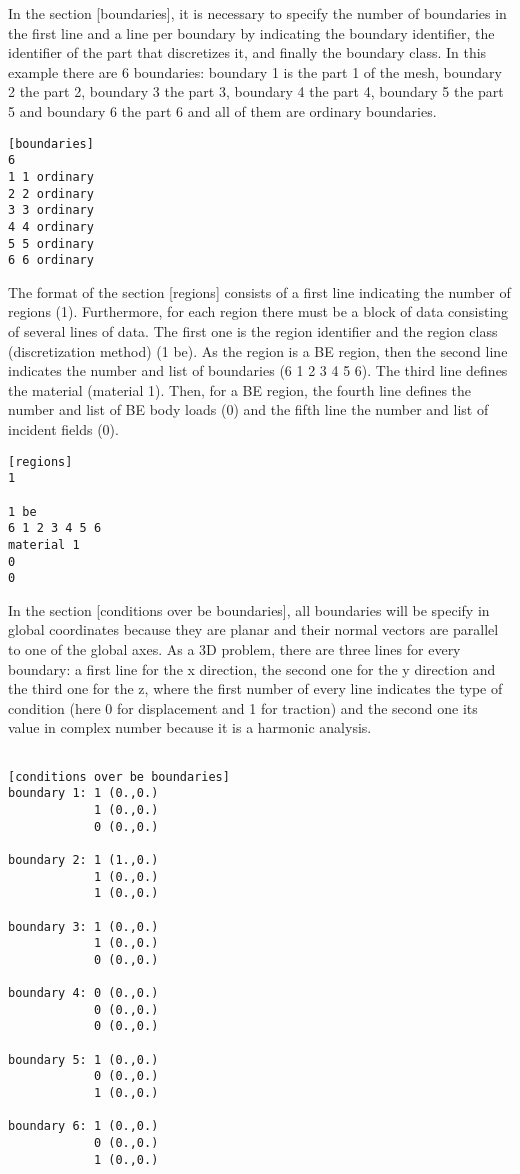 \documentclass[a4]{article}
\begin{document}
In the section [boundaries], it is necessary to specify the number of boundaries in the first line and a line per boundary by indicating the boundary identifier, the identifier of the part that discretizes it, and finally the boundary class. In this example there are 6 boundaries: boundary 1 is the part 1 of the mesh, boundary 2 the part 2, boundary 3 the part 3, boundary 4 the part 4, boundary 5 the part 5 and boundary 6 the part 6 and all of them are ordinary boundaries.

\begin{Verbatim}	
[boundaries]
6
1 1 ordinary
2 2 ordinary
3 3 ordinary
4 4 ordinary
5 5 ordinary
6 6 ordinary
\end{Verbatim}

The format of the section [regions] consists of a first line indicating the number of regions (1). Furthermore, for each region there must be a block of data consisting of several lines of data. The first one is the region identifier and the region class (discretization method) (1 be). As the region is a BE region, then the second line indicates the number and list of boundaries (6 1 2 3 4 5 6). The third line defines the material (material 1). Then, for a BE region, the fourth line defines the number and list of BE body loads (0) and the fifth line the number and list of incident fields (0).

\begin{Verbatim}	
[regions]
1

1 be
6 1 2 3 4 5 6
material 1
0
0
\end{Verbatim}

In the section [conditions over be boundaries], all boundaries will be specify in global coordinates because they are planar and their normal vectors are parallel to one of the global axes. As a 3D problem, there are three lines for every boundary: a first line for the x direction, the second one for the y direction and the third one for the z, where the first number of every line indicates the type of condition (here 0 for displacement and 1 for traction) and the second one its value in complex number because it is a harmonic analysis.

\begin{Verbatim}	

[conditions over be boundaries]
boundary 1: 1 (0.,0.)
            1 (0.,0.)
            0 (0.,0.)

boundary 2: 1 (1.,0.)
            1 (0.,0.)
            1 (0.,0.)

boundary 3: 1 (0.,0.)
            1 (0.,0.)
            0 (0.,0.)

boundary 4: 0 (0.,0.)
            0 (0.,0.)
            0 (0.,0.)

boundary 5: 1 (0.,0.)
            0 (0.,0.)
            1 (0.,0.)

boundary 6: 1 (0.,0.)
            0 (0.,0.)
            1 (0.,0.)
\end{Verbatim}
\end{document}
